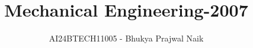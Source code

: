 \documentclass[journal]{IEEEtran}
\begin{document}

\vspace{3cm}

\title{Mechanical Engineering-2007}
\author{AI24BTECH11005 - Bhukya Prajwal Naik
}
{\let\newpage\relax\maketitle}

\renewcommand{\thefigure}{\theenumi}
\renewcommand{\thetable}{\theenumi}
\setlength{\intextsep}{10pt} %


\renewcommand{\thetable}{\theenumi}
\end{document}

